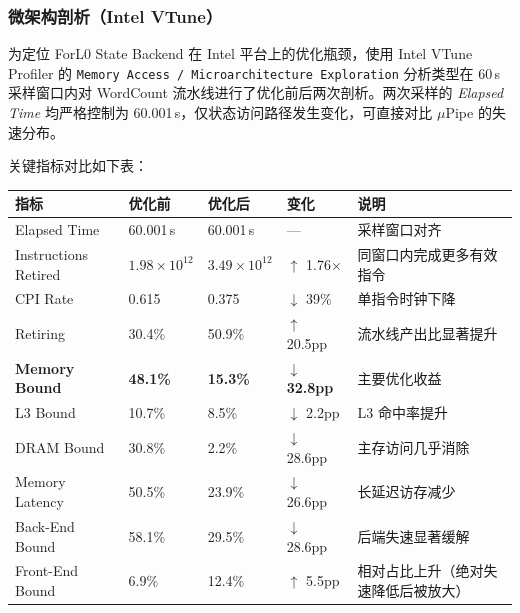 \documentclass[a4paper,11pt]{article}
\newcommand{\project}{ForL0 State Backend}
\begin{document}
\subsubsection{微架构剖析（Intel VTune）}

为定位 \project{} 在 Intel 平台上的优化瓶颈，使用 Intel VTune Profiler 的 \texttt{Memory Access / Microarchitecture Exploration} 分析类型在 60\,s 采样窗口内对 WordCount 流水线进行了优化前后两次剖析。两次采样的 \emph{Elapsed Time} 均严格控制为 60.001\,s，仅状态访问路径发生变化，可直接对比 $\mu$Pipe 的失速分布。


关键指标对比如下表：

\begin{table}[H]
\centering
\small
\begin{tabularx}{\textwidth}{L{4.2cm} R{2.3cm} R{2.3cm} R{2.3cm} X}
\toprule
\textbf{指标} & \textbf{优化前} & \textbf{优化后} & \textbf{变化} & \textbf{说明} \\
\midrule
Elapsed Time            & 60.001\,s            & 60.001\,s            & ---            & 采样窗口对齐 \\
Instructions Retired    & $1.98 \times 10^{12}$ & $3.49 \times 10^{12}$ & $\uparrow$ 1.76$\times$ & 同窗口内完成更多有效指令 \\
CPI Rate                & 0.615                & 0.375                & $\downarrow$ 39\% & 单指令时钟下降 \\
Retiring                & 30.4\%               & 50.9\%               & $\uparrow$ 20.5pp & 流水线产出比显著提升 \\
\textbf{Memory Bound}   & \textbf{48.1\%}      & \textbf{15.3\%}      & $\downarrow$ \textbf{32.8pp} & 主要优化收益 \\
\quad L3 Bound          & 10.7\%               & 8.5\%                & $\downarrow$ 2.2pp  & L3 命中率提升 \\
\quad DRAM Bound        & 30.8\%               & 2.2\%                & $\downarrow$ 28.6pp & 主存访问几乎消除 \\
\quad\quad Memory Latency & 50.5\%             & 23.9\%               & $\downarrow$ 26.6pp & 长延迟访存减少 \\
Back-End Bound          & 58.1\%               & 29.5\%               & $\downarrow$ 28.6pp & 后端失速显著缓解 \\
Front-End Bound         & 6.9\%                & 12.4\%               & $\uparrow$ 5.5pp   & 相对占比上升（绝对失速降低后被放大） \\
\bottomrule
\end{tabularx}
\end{table}
\end{document}
